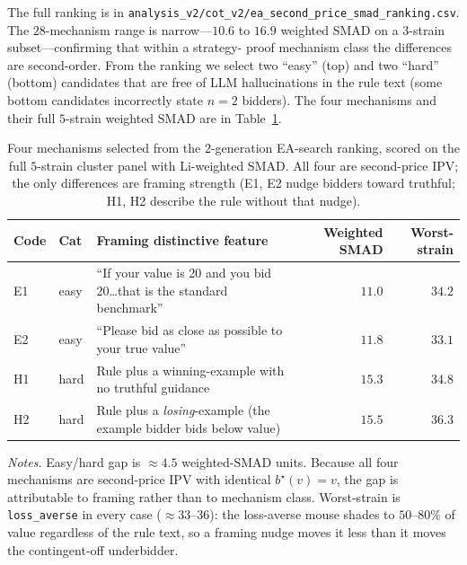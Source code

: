 \documentclass[12pt]{article}
\begin{document}
The full ranking is in
\texttt{analysis\_v2/cot\_v2/ea\_second\_price\_smad\_ranking.csv}.
The $28$-mechanism range is narrow---$10.6$ to $16.9$ weighted
SMAD on a $3$-strain subset---confirming that within a strategy-
proof mechanism class the differences are second-order. From the
ranking we select two ``easy'' (top) and two ``hard'' (bottom)
candidates that are free of LLM hallucinations in the rule text
(some bottom candidates incorrectly state $n{=}2$ bidders). The
four mechanisms and their full $5$-strain weighted SMAD are in
Table~\ref{tab:ea-top4}.


\begin{table}[t]
\centering
\caption{Four mechanisms selected from the $2$-generation
EA-search ranking, scored on the full $5$-strain cluster panel
with Li-weighted SMAD. All four are second-price IPV; the only
differences are framing strength (E1, E2 nudge bidders toward
truthful; H1, H2 describe the rule without that nudge).}
\label{tab:ea-top4}
\footnotesize
\setlength{\tabcolsep}{6pt}
\begin{tabular}{@{}llp{}rr@{}}
\toprule
Code & Cat & Framing distinctive feature & Weighted SMAD & Worst-strain \\
\midrule
E1 & easy & ``If your value is 20 and you bid 20\dots that is the standard benchmark'' & $\mathbf{11.0}$ & $34.2$ \\
E2 & easy & ``Please bid as close as possible to your true value'' & $11.8$ & $33.1$ \\
H1 & hard & Rule plus a winning-example with no truthful guidance & $15.3$ & $34.8$ \\
H2 & hard & Rule plus a \emph{losing}-example (the example bidder bids below value) & $\mathbf{15.5}$ & $36.3$ \\
\bottomrule
\end{tabular}

\vspace{0.4em}
\begin{minipage}{0.95\textwidth}
\footnotesize\textit{Notes.} Easy/hard gap is $\approx 4.5$
weighted-SMAD units. Because all four mechanisms are second-price
IPV with identical $b^\star(v) = v$, the gap is attributable to
framing rather than to mechanism class. Worst-strain is
\texttt{loss\_averse} in every case ($\approx 33$--$36$): the
loss-averse mouse shades to $50$--$80\%$ of value regardless of the
rule text, so a framing nudge moves it less than it moves the
contingent-off underbidder.\par
\end{minipage}
\end{table}
\end{document}
